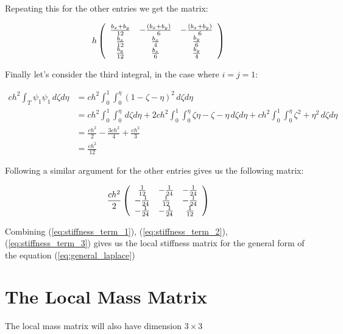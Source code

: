 Repeating this for the other entries we get the matrix:

\begin{equation}\label{eq:stiffness_term_2}
    h\left(\begin{array}{c c c}
        \frac{b_x + b_y}{12} & -\frac{(b_x + b_y)}{6} & -\frac{(b_x + b_y)}{6} \\
        \frac{b_x}{12} & \frac{b_x}{4} & \frac{b_y}{6} \\
        \frac{b_y}{12} & \frac{b_x}{6} & \frac{b_y}{4}
    \end{array}\right)
\end{equation}

Finally let's consider the third integral, in the case where $i = j = 1$:

\begin{align*}
       ch^2\int_T{\psi_1\psi_1}\,d\zeta d\eta
       &= ch^2\int_0^1\int_0^\eta{(1 - \zeta - \eta)^2}\, d\zeta d\eta \\
%
       &= ch^2\int_0^1\int_0^\eta\, d\zeta d\eta +
          2ch^2\int_0^1\int_0^\eta{\zeta\eta - \zeta - \eta}\, d\zeta d\eta +
          ch^2\int_0^1\int_0^\eta{\zeta^2 + \eta^2}\, d\zeta d\eta \\
%
       &= \frac{ch^2}{2} - \frac{3ch^2}{4} + \frac{ch^2}{3} \\
       &= \frac{ch^2}{12}
\end{align*}

Following a similar argument for the other entries gives us the following
matrix:

\begin{equation}\label{eq:stiffness_term_3}
    \frac{ch^2}{2}\left(\begin{array}{c c c}
          \frac{1}{12} & - \frac{1}{24} & - \frac{1}{24} \\
        - \frac{1}{24} &   \frac{1}{12} & - \frac{1}{24} \\
        - \frac{1}{24} & - \frac{1}{24} &   \frac{1}{12}
    \end{array}\right)
\end{equation}

Combining (\ref{eq:stiffness_term_1}), (\ref{eq:stiffness_term_2}),
(\ref{eq:stiffness_term_3}) gives us the local stiffness matrix for the general
form of the equation (\ref{eq:general_laplace})

\section{The Local Mass Matrix}

The local mass matrix will also have dimension $3 \times 3$
